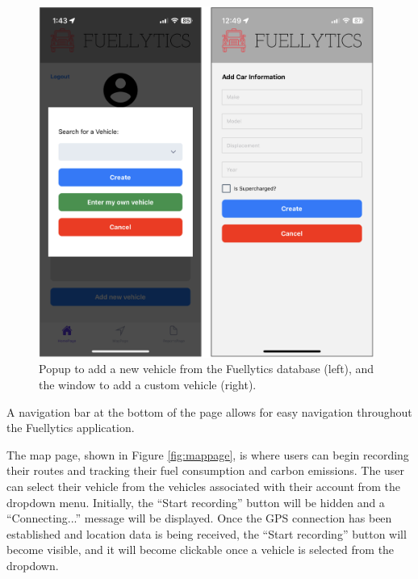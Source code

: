\documentclass[11pt, oneside]{article}
\begin{document}
\begin{figure}[H]
\centerline{\includegraphics[width=11cm]{img/add-new-vehicle.png}}
\caption{\label{fig:new-vehicle}Popup to add a new vehicle from the Fuellytics database (left), and the window to add a custom vehicle (right).}
\end{figure}

A navigation bar at the bottom of the page allows for easy navigation throughout the Fuellytics application.

The map page, shown in Figure \ref{fig:mappage}, is where users can begin recording their routes and tracking their fuel consumption and carbon emissions.  The user can select their vehicle from the vehicles associated with their account from the dropdown menu.  Initially, the ``Start recording'' button will be hidden and a ``Connecting...'' message will be displayed.  Once the GPS connection has been established and location data is being received, the ``Start recording'' button will become visible, and it will become clickable once a vehicle is selected from the dropdown.
\end{document}

